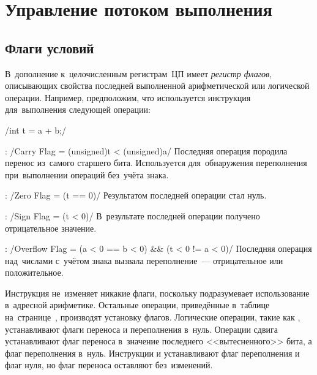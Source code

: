
\chapter{Управление потоком выполнения}

\section{Флаги условий}
В~дополнение к~целочисленным регистрам~ЦП имеет \emph{регистр флагов}, описывающих свойства последней выполненной арифметической или логической операции. Например, предположим, что используется инструкция  для~выполнения следующей операции:

\cc/int t = a + b;/

\begin{itemfeature}[itemsep=0pt]
  \item[\code{CF}:] \cinline/Carry Flag = (unsigned)t < (unsigned)a/
    \hspace{0.5em} Последняя операция породила перенос из~самого старшего бита. Используется для~обнаружения переполнения при~выполнении операций без~учёта знака.

  \item[\code{ZF}:] \cinline/Zero Flag = (t == 0)/
    \hspace{0.5em} Результатом последней операции стал нуль.

  \item[\code{SF}:] \cinline/Sign Flag = (t < 0)/
    \hspace{0.5em} В~результате последней операции получено отрицательное значение.

  \item[\code{OF}:] \cinline/Overflow Flag = (a < 0 == b < 0) && (t < 0 != a < 0)/
    \hspace{0.5em} Последняя операция над~числами с~учётом знака вызвала переполнение~--- отрицательное или положительное.
\end{itemfeature}

Инструкция  не~изменяет никакие флаги, поскольку подразумевает использование в~адресной арифметике. Остальные операции, приведённые в~таблице на~странице~\pageref{tab:cmd:arithlogic}, производят установку флагов. Логические операции, такие как , устанавливают флаги переноса и переполнения в~нуль. Операции сдвига устанавливают флаг переноса в~значение последнего <<вытесненного>> бита, а флаг переполнения в~нуль. Инструкции  и  устанавливают флаг переполнения и флаг нуля, но флаг переноса оставляют без~изменений.

